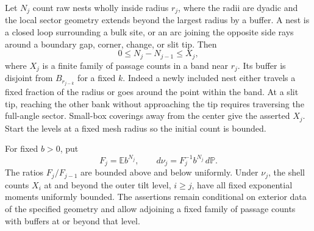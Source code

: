 Let $N_j$ count raw nests wholly inside radius $r_j$, where the radii are
dyadic and the local sector geometry extends beyond the largest radius
by a buffer. A nest is a closed loop surrounding a bulk site, or an arc
joining the opposite side rays around a boundary gap, corner, change, or
slit tip. Then
\begin{equation}\label{prelim:nest-increments}
 0\le N_j-N_{j-1}\le X_j,
\end{equation}
where $X_j$ is a finite family of passage counts in a band near $r_j$.
Its buffer is disjoint from $B_{r_{j-k}}$ for a fixed $k$. Indeed a newly
included nest either travels a fixed fraction of the radius or goes
around the point within the band. At a slit tip, reaching the other bank
without approaching the tip requires traversing the full-angle sector.
Small-box coverings away from the center give the asserted $X_j$.
Start the levels at a fixed mesh radius so the initial count is bounded.

\begin{lemma}\label{prelim:tilts}
For fixed $b>0$, put
\[
 F_j=\mathbb E b^{N_j},\qquad
 d\nu_j=F_j^{-1}b^{N_j}\,d\mathbb P.
\]
The ratios $F_j/F_{j-1}$ are bounded above and below uniformly.
Under $\nu_j$, the shell counts $X_i$ at and beyond the outer tilt
level, $i\ge j$, have all fixed exponential moments uniformly bounded.
The assertions remain conditional on exterior data of the specified
geometry and allow adjoining a fixed family of passage counts with
buffers at or beyond that level.
\end{lemma}

